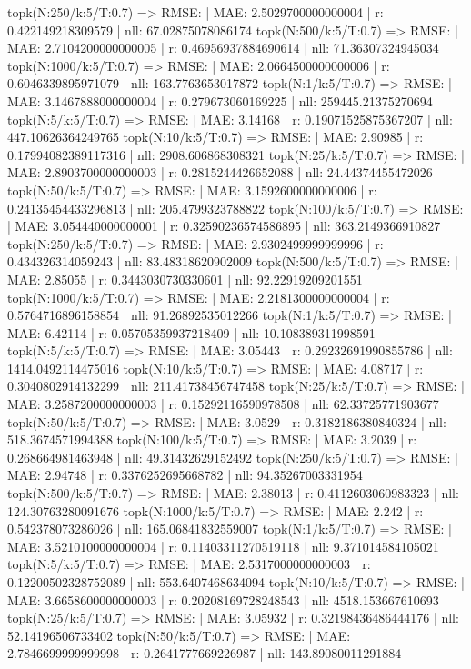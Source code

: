 topk(N:250/k:5/T:0.7) => RMSE: | MAE: 2.5029700000000004 | r: 0.422149218309579 | nll: 67.02875078086174
topk(N:500/k:5/T:0.7) => RMSE: | MAE: 2.7104200000000005 | r: 0.46956937884690614 | nll: 71.36307324945034
topk(N:1000/k:5/T:0.7) => RMSE: | MAE: 2.0664500000000006 | r: 0.6046339895971079 | nll: 163.7763653017872
topk(N:1/k:5/T:0.7) => RMSE: | MAE: 3.1467888000000004 | r: 0.279673060169225 | nll: 259445.21375270694
topk(N:5/k:5/T:0.7) => RMSE: | MAE: 3.14168 | r: 0.19071525875367207 | nll: 447.10626364249765
topk(N:10/k:5/T:0.7) => RMSE: | MAE: 2.90985 | r: 0.17994082389117316 | nll: 2908.606868308321
topk(N:25/k:5/T:0.7) => RMSE: | MAE: 2.8903700000000003 | r: 0.2815244426652088 | nll: 24.44374455472026
topk(N:50/k:5/T:0.7) => RMSE: | MAE: 3.1592600000000006 | r: 0.24135454433296813 | nll: 205.4799323788822
topk(N:100/k:5/T:0.7) => RMSE: | MAE: 3.054440000000001 | r: 0.32590236574586895 | nll: 363.2149366910827
topk(N:250/k:5/T:0.7) => RMSE: | MAE: 2.9302499999999996 | r: 0.434326314059243 | nll: 83.48318620902009
topk(N:500/k:5/T:0.7) => RMSE: | MAE: 2.85055 | r: 0.3443030730330601 | nll: 92.22919209201551
topk(N:1000/k:5/T:0.7) => RMSE: | MAE: 2.2181300000000004 | r: 0.5764716896158854 | nll: 91.26892535012266
topk(N:1/k:5/T:0.7) => RMSE: | MAE: 6.42114 | r: 0.05705359937218409 | nll: 10.108389311998591
topk(N:5/k:5/T:0.7) => RMSE: | MAE: 3.05443 | r: 0.29232691990855786 | nll: 1414.0492114475016
topk(N:10/k:5/T:0.7) => RMSE: | MAE: 4.08717 | r: 0.3040802914132299 | nll: 211.41738456747458
topk(N:25/k:5/T:0.7) => RMSE: | MAE: 3.2587200000000003 | r: 0.15292116590978508 | nll: 62.33725771903677
topk(N:50/k:5/T:0.7) => RMSE: | MAE: 3.0529 | r: 0.3182186380840324 | nll: 518.3674571994388
topk(N:100/k:5/T:0.7) => RMSE: | MAE: 3.2039 | r: 0.268664981463948 | nll: 49.31432629152492
topk(N:250/k:5/T:0.7) => RMSE: | MAE: 2.94748 | r: 0.3376252695668782 | nll: 94.35267003331954
topk(N:500/k:5/T:0.7) => RMSE: | MAE: 2.38013 | r: 0.4112603060983323 | nll: 124.30763280091676
topk(N:1000/k:5/T:0.7) => RMSE: | MAE: 2.242 | r: 0.542378073286026 | nll: 165.06841832559007
topk(N:1/k:5/T:0.7) => RMSE: | MAE: 3.5210100000000004 | r: 0.11403311270519118 | nll: 9.371014584105021
topk(N:5/k:5/T:0.7) => RMSE: | MAE: 2.5317000000000003 | r: 0.12200502328752089 | nll: 553.6407468634094
topk(N:10/k:5/T:0.7) => RMSE: | MAE: 3.6658600000000003 | r: 0.20208169728248543 | nll: 4518.153667610693
topk(N:25/k:5/T:0.7) => RMSE: | MAE: 3.05932 | r: 0.32198436486444176 | nll: 52.14196506733402
topk(N:50/k:5/T:0.7) => RMSE: | MAE: 2.7846699999999998 | r: 0.2641777669226987 | nll: 143.89080011291884
